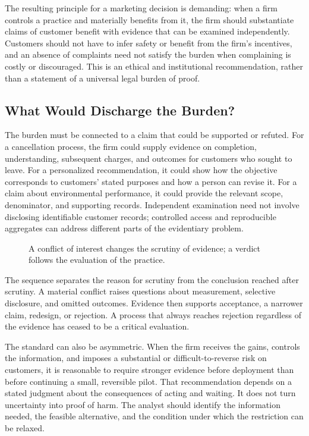 The resulting principle for a marketing decision is demanding: when a
firm controls a practice and materially benefits from it, the firm
should substantiate claims of customer benefit with evidence that can be
examined independently. Customers should not have to infer safety or
benefit from the firm's incentives, and an absence of complaints need
not satisfy the burden when complaining is costly or discouraged. This
is an ethical and institutional recommendation, rather than a statement
of a universal legal burden of proof.

\hypertarget{M09-what-would-discharge-the-burden}{%
\subsection{What Would Discharge the
Burden?}\label{M09-what-would-discharge-the-burden}}

\noindent \noindent The burden must be connected to a claim that could be
supported or refuted. For a cancellation process, the firm could supply
evidence on completion, understanding, subsequent charges, and outcomes
for customers who sought to leave. For a personalized recommendation, it
could show how the objective corresponds to customers' stated purposes
and how a person can revise it. For a claim about environmental
performance, it could provide the relevant scope, denominator, and
supporting records. Independent examination need not involve disclosing
identifiable customer records; controlled access and reproducible
aggregates can address different parts of the evidentiary problem.

\begin{figure}[htbp]
\centering

\caption{A conflict of interest changes the scrutiny of evidence; a verdict follows the evaluation of the practice.}\label{fig:M09_burden_justification}
\end{figure}

The sequence separates the reason for scrutiny from the conclusion
reached after scrutiny. A material conflict raises questions about
measurement, selective disclosure, and omitted outcomes. Evidence then
supports acceptance, a narrower claim, redesign, or rejection. A process
that always reaches rejection regardless of the evidence has ceased to
be a critical evaluation.

The standard can also be asymmetric. When the firm receives the gains,
controls the information, and imposes a substantial or
difficult-to-reverse risk on customers, it is reasonable to require
stronger evidence before deployment than before continuing a small,
reversible pilot. That recommendation depends on a stated judgment about
the consequences of acting and waiting. It does not turn uncertainty
into proof of harm. The analyst should identify the information needed,
the feasible alternative, and the condition under which the restriction
can be relaxed.

